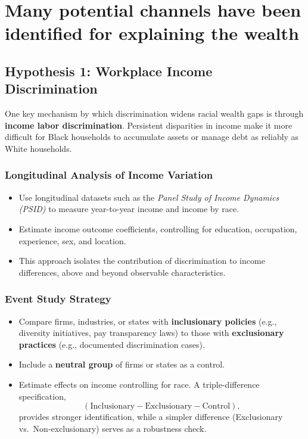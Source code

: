 \documentclass[
  12pt]{article}
\providecommand{\tightlist}{%
  \setlength{\itemsep}{0pt}\setlength{\parskip}{0pt}}\usepackage{longtable,booktabs,array}
\begin{document}
\section{Many potential channels have been identified for explaining the
wealth}\label{many-potential-channels-have-been-identified-for-explaining-the-wealth}

\subsection{Hypothesis 1: Workplace Income
Discrimination}\label{hypothesis-1-workplace-income-discrimination}

One key mechanism by which discrimination widens racial wealth gaps is
through \textbf{income labor discrimination}. Persistent disparities in
income make it more difficult for Black households to accumulate assets
or manage debt as reliably as White households.

\subsubsection{Longitudinal Analysis of Income
Variation}\label{longitudinal-analysis-of-income-variation}

\begin{itemize}
\tightlist
\item
  Use longitudinal datasets such as the \emph{Panel Study of Income
  Dynamics (PSID)} to measure year-to-year income and income by race.
\item
  Estimate income outcome coefficients, controlling for education,
  occupation, experience, sex, and location.
\item
  This approach isolates the contribution of discrimination to income
  differences, above and beyond observable characteristics.
\end{itemize}

\subsubsection{Event Study Strategy}\label{event-study-strategy}

\begin{itemize}
\tightlist
\item
  Compare firms, industries, or states with \textbf{inclusionary
  policies} (e.g., diversity initiatives, pay transparency laws) to
  those with \textbf{exclusionary practices} (e.g., documented
  discrimination cases).
\item
  Include a \textbf{neutral group} of firms or states as a control.
\item
  Estimate effects on income controlling for race. A triple-difference
  specification,
  \[(\text{Inclusionary} - \text{Exclusionary} - \text{Control}),\]
  provides stronger identification, while a simpler difference
  (Exclusionary vs.~Non-exclusionary) serves as a robustness check.
\end{itemize}
\end{document}
